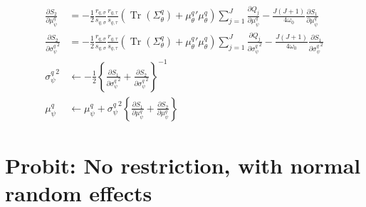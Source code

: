 \documentclass[11pt]{article}
\DeclareMathOperator{\Tr}{Tr}
\begin{document}
\begin{align*}
  \frac{\partial S_{2}}{\partial \mu_{\psi}^{q}} &= -\frac{1}{2}\frac{r_{q,\sigma}}{s_{q,\sigma}}\frac{r_{q,\tau}}{s_{q,\tau}}\left(\Tr\left(\Sigma_{\theta}^{q}\right)+{\mu_{\theta}^{q}}'\mu_{\theta}^{q} \right)\sum_{j=1}^{J}\frac{\partial Q_{j}}{\partial \mu_{\psi}^{q}} -\frac{J\left(J+1\right)}{4\omega_{0}}\frac{\partial S_{1}}{\partial \mu_{\psi}^{q}}\\
  \frac{\partial S_{2}}{\partial {\sigma_{\psi}^{q}}^{2}} &= -\frac{1}{2}\frac{r_{q,\sigma}}{s_{q,\sigma}}\frac{r_{q,\tau}}{s_{q,\tau}}\left(\Tr\left(\Sigma_{\theta}^{q}\right)+{\mu_{\theta}^{q}}'\mu_{\theta}^{q} \right)\sum_{j=1}^{J}\frac{\partial Q_{j}}{\partial {\sigma_{\psi}^{q}}^{2}} -\frac{J\left(J+1\right)}{4\omega_{0}}\frac{\partial S_{1}}{\partial {\sigma_{\psi}^{q}}^{2}}\\
  {\sigma_{\psi}^{q}}^{2} &\leftarrow -\frac{1}{2}\left\{\frac{\partial S_{1}}{\partial {\sigma_{\psi}^{q}}^{2}}+\frac{\partial S_{2}}{\partial {\sigma_{\psi}^{q}}^{2}} \right\}^{-1}\\
  \mu_{\psi}^{q} &\leftarrow \mu_{\psi}^{q} +{\sigma_{\psi}^{q}}^{2}\left\{\frac{\partial S_{1}}{\partial \mu_{\psi}^{q}}+\frac{\partial S_{2}}{\partial \mu_{\psi}^{q}} \right\}
\end{align*}

\section{Probit: No restriction, with normal random effects}
\end{document}
